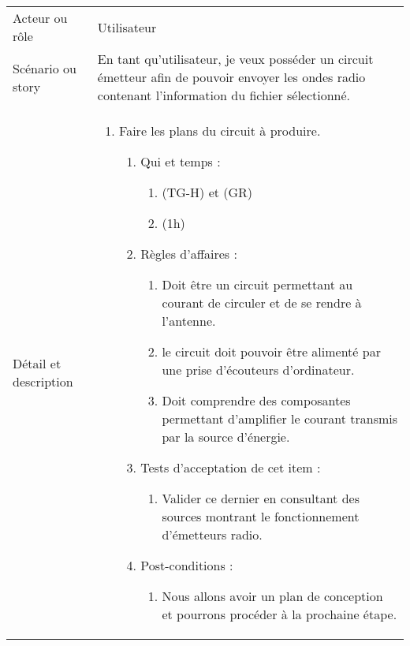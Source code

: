 \begin{longtable}{|l|p{}|}
\hline
    \rowcolor{Gray}
    \multicolumn{2}{|l|}{3} \\
\hline
    Acteur ou rôle & Utilisateur \\
\hline
    Scénario ou story & En tant qu’utilisateur, je veux posséder un circuit
    émetteur afin de pouvoir envoyer les ondes radio contenant l’information
    du fichier sélectionné. \\
\hline
    Détail et description &
        \begin{enumerate}[label*=\arabic*.]
        \item Faire les plans du circuit à produire.
            \begin{enumerate}[label*=\arabic*.]
                    \item Qui et temps :
                    \begin{enumerate}[label*=\arabic*.]
                        \item (TG-H) et (GR)
                        \item (1h)
                    \end{enumerate}
                    \item Règles d’affaires :
                    \begin{enumerate}[label*=\arabic*.]
                        \item Doit être un circuit permettant au courant de circuler et de se rendre à l'antenne.
                        \item le circuit doit pouvoir être alimenté par une prise d'écouteurs d'ordinateur.
                        \item Doit comprendre des composantes permettant d'amplifier le courant transmis par la source d'énergie.
                    \end{enumerate}
                    \item Tests d'acceptation de cet item :
                    \begin{enumerate}[label*=\arabic*.]
                        \item Valider ce dernier en consultant des sources montrant le fonctionnement d'émetteurs radio. 
                    \end{enumerate}
                    \item Post-conditions :
                    \begin{enumerate}[label*=\arabic*.]
                        \item Nous allons avoir un plan de conception et pourrons procéder à la prochaine étape.

\end{enumerate}
\end{enumerate}
\end{enumerate}
\end{longtable}
